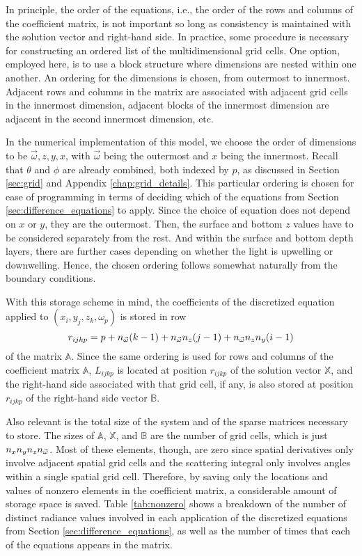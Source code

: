 In principle, the order of the equations, i.e., the order of the rows and columns of the coefficient matrix, is not important
so long as consistency is maintained with the solution vector and right-hand side.
In practice, some procedure is necessary for constructing an ordered list of the multidimensional grid cells.
One option, employed here, is to use a block structure where dimensions are nested within one another.
An ordering for the dimensions is chosen, from outermost to innermost.
Adjacent rows and columns in the matrix are associated with adjacent grid cells in the innermost dimension,
adjacent blocks of the innermost dimension are adjacent in the second innermost dimension, etc.

In the numerical implementation of this model, we choose the order of dimensions to be $\vec{\omega}, z, y, x$, with $\vec{\omega}$ being the outermost and $x$ being the innermost.
Recall that $\theta$ and $\phi$ are already combined, both indexed by $p$, as discussed in Section \ref{sec:grid} and Appendix \ref{chap:grid_details}.
This particular ordering is chosen for ease of programming in terms of deciding which of the equations from Section \ref{sec:difference_equations} to apply.
Since the choice of equation does not depend on $x$ or $y$, they are the outermost.
Then, the surface and bottom $z$ values have to be considered separately from the rest.
And within the surface and bottom depth layers, there are further cases depending on whether the light is upwelling or downwelling.
Hence, the chosen ordering follows somewhat naturally from the boundary conditions.

With this storage scheme in mind, the coefficients of the discretized equation applied to $(x_i, y_j, z_k, \omega_p)$ is stored in row
\begin{equation*}
  r_{ijkp} = p + {n_{\vec{\omega}}} (k-1) + {n_{\vec{\omega}}} n_z (j-1) + {n_{\vec{\omega}}} n_z n_y (i-1)
\end{equation*}
of the matrix $\mathbb{A}$.
Since the same ordering is used for rows and columns of the coefficient matrix $\mathbb{A}$, $L_{ijkp}$ is located at position $r_{ijkp}$ of the solution vector $\mathbb{X}$,
and the right-hand side associated with that grid cell, if any, is also stored at position $r_{ijkp}$ of the right-hand side vector $\mathbb{B}$.

Also relevant is the total size of the system and of the sparse matrices necessary to store.
The sizes of $\mathbb{A}$, $\mathbb{X}$, and $\mathbb{B}$ are the number of grid cells, which is just $n_xn_yn_z{n_{\vec{\omega}}}$.
Most of these elements, though, are zero since spatial derivatives only involve adjacent spatial grid cells and the scattering integral only involves angles within a single spatial grid cell.
Therefore, by saving only the locations and values of nonzero elements in the coefficient matrix, a considerable amount of storage space is saved.
Table \ref{tab:nonzero} shows a breakdown of the number of distinct radiance values involved in each application of the discretized equations from Section \ref{sec:difference_equations}, as well as the number of times that each of the equations appears in the matrix.

